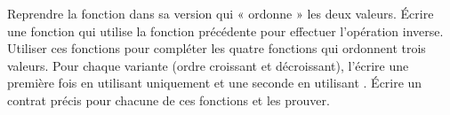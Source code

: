 



Reprendre la fonction  dans sa version qui « ordonne »
les deux valeurs. Écrire une fonction  qui utilise la
fonction précédente pour effectuer l'opération inverse. Utiliser ces fonctions
pour compléter les quatre fonctions qui ordonnent trois valeurs. Pour chaque
variante (ordre croissant et décroissant), l'écrire une première fois en
utilisant uniquement  et une seconde en utilisant
. Écrire un contrat précis pour chacune de ces fonctions
et les prouver.


